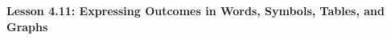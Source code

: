 \begin{center}
\textbf{Lesson 4.11: Expressing Outcomes in Words, Symbols, Tables, and Graphs}
\end{center}

\vspace*{-1.5ex}

